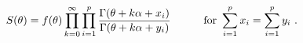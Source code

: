 \begin{equation}
S(\theta )=f(\theta )\prod\limits_{k=0}^{\infty }\prod\limits_{i=1}^{p}\frac{%
\Gamma (\theta +k\alpha +x_{i})}{\Gamma (\theta +k\alpha +y_{i})}\qquad
\quad \text{for }\sum\limits_{i=1}^{p}x_{i}=\sum\limits_{i=1}^{p}y_{i}~.
\label{gen}
\end{equation}

